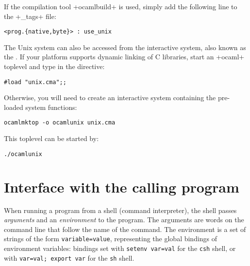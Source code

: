 If the compilation tool  \ml+ocamlbuild+ is used, simply add the
following line to the 
\ml+_tags+ file:
%
\begin{lstlisting}
<prog.{native,byte}> : use_unix
\end{lstlisting}
% 
The Unix system can also be accessed from the interactive system,
also known as the . If your platform supports dynamic
linking of C libraries, start an \ml+ocaml+ toplevel and type in the
directive:
%
\begin{lstlisting}
#load "unix.cma";;
\end{lstlisting}
%
Otherwise, you will need to create an interactive system containing
the pre-loaded system functions:
%
\begin{lstlisting}
ocamlmktop -o ocamlunix unix.cma
\end{lstlisting}
%
This toplevel can be started by:
\begin{lstlisting}
./ocamlunix
\end{lstlisting}

\section{Interface with the calling program}

When running a program from a shell (command interpreter), the shell
passes \emph{arguments} and an \emph{environment} to the program.  The
arguments are words on the command line that follow the name of the
command. The environment is a set of strings of the form
\texttt{variable=value}, representing the global bindings of environment
variables: bindings set with \texttt{setenv var=val} for the
\texttt{csh} shell, or with \texttt{var=val; export var} for
the \texttt{sh} shell.

